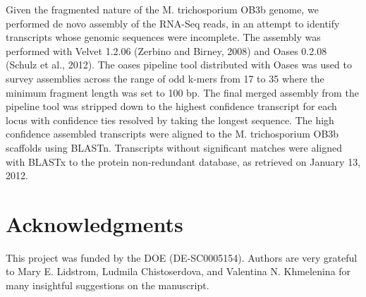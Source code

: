 Given the fragmented nature of the M. trichosporium OB3b genome, we performed de novo assembly of the RNA-Seq reads, in an attempt to identify transcripts whose genomic sequences were incomplete.
The assembly was performed with Velvet 1.2.06 (Zerbino and Birney, 2008) and Oases 0.2.08 (Schulz et al., 2012).
The oases pipeline tool distributed with Oases was used to survey assemblies across the range of odd k-mers from 17 to 35 where the minimum fragment length was set to 100 bp.
The final merged assembly from the pipeline tool was stripped down to the highest confidence transcript for each locus with confidence ties resolved by taking the longest sequence.
The high confidence assembled transcripts were aligned to the M. trichosporium OB3b scaffolds using BLASTn.
Transcripts without significant matches were aligned with BLASTx to the protein non-redundant database, as retrieved on January 13, 2012.

\section*{Acknowledgments}
This project was funded by the DOE (DE-SC0005154).
Authors are very grateful to Mary E. Lidstrom, Ludmila Chistoserdova, and Valentina N. Khmelenina for many insightful suggestions on the manuscript.


